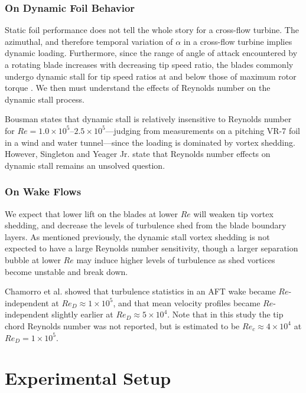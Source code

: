 \documentclass[energies,article,accept,moreauthors,pdftex,12pt,a4paper]{mdpi}
\begin{document}
\subsubsection{On Dynamic Foil Behavior}

Static foil performance does not tell the whole story for a cross-flow turbine.
The azimuthal, and therefore temporal variation of $\alpha$ in a cross-flow
turbine implies dynamic loading. Furthermore, since the range of angle of attack
encountered by a rotating blade increases with decreasing tip speed ratio, the
blades commonly undergo dynamic stall for tip speed ratios at and below those of
maximum rotor torque \cite{Para2002}. We then must understand the effects of
Reynolds number on the dynamic stall process.

Bousman \cite{Bousman2000-evaluation} states that dynamic stall is relatively
insensitive to Reynolds number for $Re=1.0 \times 10^5$--$2.5 \times
10^5$---judging from measurements on a pitching VR-7 foil in a wind and water
tunnel---since the loading is dominated by vortex shedding. However, Singleton
and Yeager Jr. \cite{Singleton2000} state that Reynolds number effects on
dynamic stall remains an unsolved question.


\subsubsection{On Wake Flows}

We expect that lower lift on the blades at lower $Re$ will weaken tip vortex
shedding, and decrease the levels of turbulence shed from the blade boundary
layers. As mentioned previously, the dynamic stall vortex shedding is not
expected to have a large Reynolds number sensitivity, though a larger separation
bubble at lower $Re$ may induce higher levels of turbulence as shed vortices
become unstable and break down.

Chamorro et al. \cite{Chamorro2012} showed that turbulence statistics in an AFT
wake became $Re$-independent at $Re_D \approx 1 \times 10^5$, and that mean
velocity profiles became $Re$-independent slightly earlier at $Re_D \approx 5
\times 10^4$. Note that in this study the tip chord Reynolds number was not
reported, but is estimated to be $Re_c \approx 4 \times 10^4$ at $Re_D=1 \times
10^5$.


\section{Experimental Setup}
\end{document}

